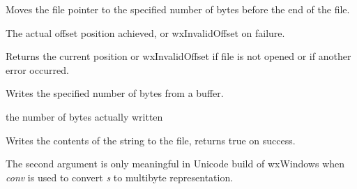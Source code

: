 Moves the file pointer to the specified number of bytes before the end of the file.




The actual offset position achieved, or wxInvalidOffset on failure.

\label{wxfiletell}


Returns the current position or wxInvalidOffset if file is not opened or if another
error occurred.

\label{wxfilewrite}


Writes the specified number of bytes from a buffer.





the number of bytes actually written

\label{wxfilewrites}


Writes the contents of the string to the file, returns true on success.

The second argument is only meaningful in Unicode build of wxWindows when
{\it conv} is used to convert {\it s} to multibyte representation.

